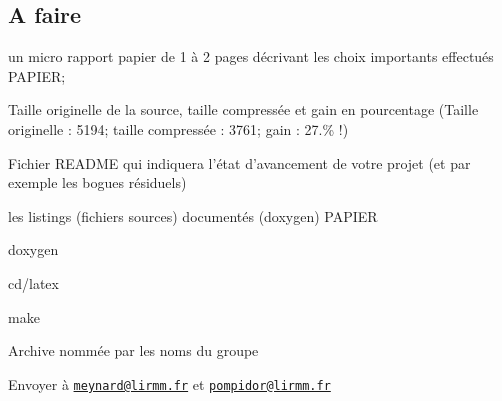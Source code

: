 \subsection*{A faire}


\begin{DoxyItemize}
\item un micro rapport papier de 1 à 2 pages décrivant les choix importants effectués P\+A\+P\+I\+ER;
\item Taille originelle de la source, taille compressée et gain en pourcentage (Taille originelle \+: 5194; taille compressée \+: 3761; gain \+: 27.\% !)
\item Fichier R\+E\+A\+D\+ME qui indiquera l’état d’avancement de votre projet (et par exemple les bogues résiduels)
\item les listings (fichiers sources) documentés (doxygen) P\+A\+P\+I\+ER
\item doxygen
\item cd/latex
\item make
\item Archive nommée par les noms du groupe
\item Envoyer à \href{mailto:meynard@lirmm.fr}{\tt meynard@lirmm.\+fr} et \href{mailto:pompidor@lirmm.fr}{\tt pompidor@lirmm.\+fr}
\end{DoxyItemize}






